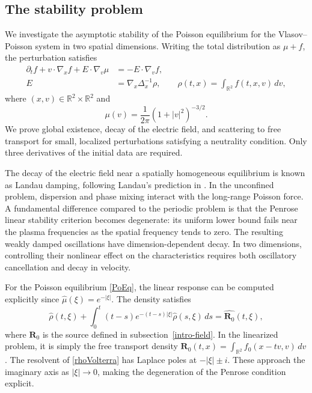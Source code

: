 \documentclass[reqno,11pt]{amsart}
\numberwithin{equation}{section}
\def\R{{\mathbb R}}
\def\R{{\bf R}}
\def\R{\mathbb{R}}
\begin{document}
\subsection{The stability problem} We investigate the asymptotic stability of the Poisson equilibrium for the
Vlasov--Poisson system in two spatial dimensions. Writing the total
distribution as $\mu+f$, the perturbation satisfies
\begin{equation}\label{eq2}
	\begin{split}
		\partial_t f+v\cdot\nabla_x f+E\cdot\nabla_v\mu
		&=-E\cdot\nabla_v f,\\
		E&=\nabla_x\Delta_x^{-1}\rho,\qquad
		\rho(t,x)=\int_{\R^2}f(t,x,v)\,dv,
	\end{split}
\end{equation}
where $(x,v)\in\R^2\times\R^2$ and
\begin{equation}\label{PoEq}
	\mu(v)=\frac{1}{2\pi}(1+|v|^2)^{-3/2}.
\end{equation}
We prove global existence, decay of the electric field, and scattering
to free transport for small, localized perturbations satisfying a
neutrality condition. Only three derivatives of the initial data are
required.

The decay of the electric field near a spatially homogeneous equilibrium
is known as Landau damping, following Landau's prediction in
\cite{landau}. In the unconfined problem, dispersion and phase mixing
interact with the long-range Poisson force. A fundamental difference compared to the periodic problem is that the Penrose linear stability
criterion becomes degenerate: its uniform lower bound fails near
the plasma frequencies as the spatial frequency tends to zero.
The resulting weakly damped oscillations have dimension-dependent
decay. In two dimensions, controlling their nonlinear effect on the
characteristics requires both oscillatory cancellation and decay
in velocity.

For the Poisson equilibrium \eqref{PoEq}, the linear response can be computed
explicitly since $\widehat\mu(\xi)=e^{-|\xi|}$. The density satisfies
\begin{equation}\label{rhoVolterra}
	\widehat\rho(t,\xi)+\int_0^t(t-s)e^{-(t-s)|\xi|}
	\widehat\rho(s,\xi)\,ds=\widehat{\mathbf R_0}(t,\xi),
\end{equation}
where $\mathbf R_0$ is the source defined in subsection~\ref{intro-field}. In the
linearized problem, it is simply the free transport density
$\mathbf R_0(t,x)=\int_{\R^2}f_0(x-tv,v)\,dv$. The resolvent of
\eqref{rhoVolterra} has Laplace poles at $-|\xi|\pm i$. These approach
the imaginary axis as $|\xi|\to0$, making the degeneration of the
Penrose condition explicit.
\end{document}
